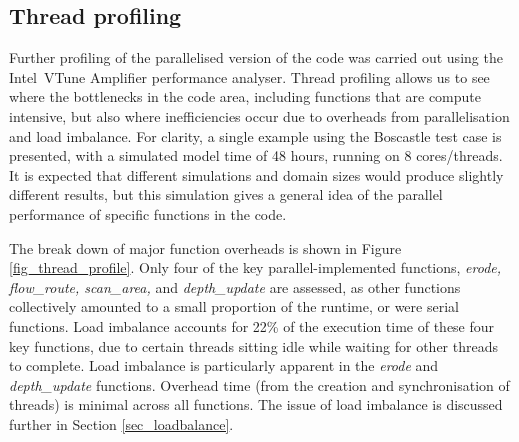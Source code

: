 %
%

\subsection{Thread profiling}

Further profiling of the parallelised version of the code was carried out using the Intel\textregistered \ VTune Amplifier performance analyser. Thread profiling allows us to see where the bottlenecks in the code area, including functions that are compute intensive, but also where inefficiencies occur due to overheads from parallelisation and load imbalance. For clarity, a single example using the Boscastle test case is presented, with a simulated model time of 48 hours, running on 8 cores/threads. It is expected that different simulations and domain sizes would produce slightly different results, but this simulation gives a general idea of the parallel performance of specific functions in the code.

The break down of major function overheads is shown in Figure \ref{fig_thread_profile}. Only four of the key parallel-implemented functions, \textit{erode, flow\_route, scan\_area,} and \textit{depth\_update} are assessed, as other functions collectively amounted to a small proportion of the runtime, or were serial functions. Load imbalance accounts for 22\% of the execution time of these four key functions, due to certain threads sitting idle while waiting for other threads to complete. Load imbalance is particularly apparent in the \textit{erode} and \textit{depth\_update} functions. Overhead time (from the creation and synchronisation of threads) is minimal across all functions. The issue of load imbalance is discussed further in Section \ref{sec_loadbalance}.

